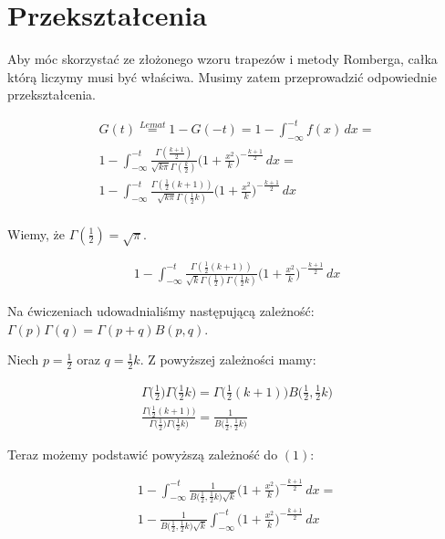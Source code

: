 \documentclass{article}
\begin{document}
\section*{Przekształcenia}
Aby móc skorzystać ze złożonego wzoru trapezów i metody Romberga, całka którą liczymy musi być właściwa. Musimy zatem przeprowadzić odpowiednie przekształcenia. 

\begin{gather*}
    G(t) \stackrel{Lemat}{=} 1 - G(-t) = 1 -\int_{-\infty}^{-t} f(x) \, dx = \\
    1 -\int_{-\infty}^{-t} \frac{\Gamma{(\frac{k+1}{2} )}}{\sqrt{k \pi} \Gamma{(\frac{k}{2})}}\Big(1 + \frac{x^2}{k}\Big)^{-\frac{k+1}{2}} \, dx =\\
    1 - \int_{-\infty}^{-t} \frac{\Gamma{(\frac{1}{2} (k+1) )}}{\sqrt{k \pi} \Gamma{(\frac{1}{2} k)}}\Big(1 + \frac{x^2}{k}\Big)^{-\frac{k+1}{2}} \, dx\\
\end{gather*}

Wiemy, że $\Gamma{(\frac{1}{2})} = \sqrt{\pi}$. 

\begin{gather}
    1 - \int_{-\infty}^{-t} \frac{\Gamma{(\frac{1}{2} (k+1) )}}{\sqrt{k} \Gamma{(\frac{1}{2})} \Gamma{(\frac{1}{2} k)}}\Big(1 + \frac{x^2}{k}\Big)^{-\frac{k+1}{2}} \, dx
\end{gather}

Na ćwiczeniach udowadnialiśmy następującą zależność: $\Gamma{(p)} \Gamma{(q)} = \Gamma{(p+q)} B{(p,q)}$.

Niech $p = \frac{1}{2}$ oraz $q = \frac{1}{2}k$. Z powyższej zależności mamy:

\begin{gather*}
\Gamma{\Big(\frac{1}{2}\Big)} \Gamma{\Big(\frac{1}{2}k\Big)} = \Gamma{\Big(\frac{1}{2} (k+1)\Big)} B{\Big(\frac{1}{2},\frac{1}{2}k\Big)}\\
\frac{\Gamma{\Big(\frac{1}{2} (k+1)\Big)}}{\Gamma{\Big(\frac{1}{2}\Big)} \Gamma{\Big(\frac{1}{2}k\Big)} } = \frac{1}{B{\Big(\frac{1}{2},\frac{1}{2}k\Big)}}
\end{gather*}

Teraz możemy podstawić powyższą zależność do $(1)$: 

\begin{gather*}
    1 - \int_{-\infty}^{-t} \frac{1}{B{\Big(\frac{1}{2},\frac{1}{2}k\Big) \sqrt{k}}}\Big(1 + \frac{x^2}{k}\Big)^{-\frac{k+1}{2}} \, dx =\\
    1 - \frac{1}{B{\Big(\frac{1}{2},\frac{1}{2}k\Big) \sqrt{k}}} \int_{-\infty}^{-t} \Big(1 + \frac{x^2}{k}\Big)^{-\frac{k+1}{2}} \, dx 
\end{gather*}
\end{document}
